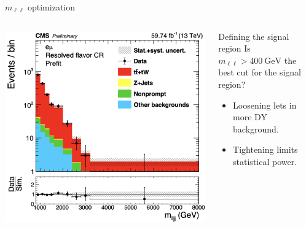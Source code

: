 \documentclass[aspectratio=169]{beamer}
\begin{document}
\begin{frame}{$m_{\ell \ell}$ optimization}
  \begin{columns}
    \begin{column}{0.50\textwidth}
      \centering
      \includegraphics[width=\textwidth]{../figures/plots/mass-fourobject-flavorcr.png}
    \end{column}
    \begin{column}{0.50\textwidth}
        \centering
        \resizebox{\columnwidth}{!}{%
        }
      \begin{block}{Defining the signal region}
        Is $m_{\ell \ell} > 400 \mathrm{~GeV}$ the best cut for the signal region?
        \begin{itemize}
          \item Loosening lets in more DY background.
          \item Tightening limits statistical power.
        \end{itemize}
      \end{block}
    \end{column}
  \end{columns}
\end{frame}
\end{document}
